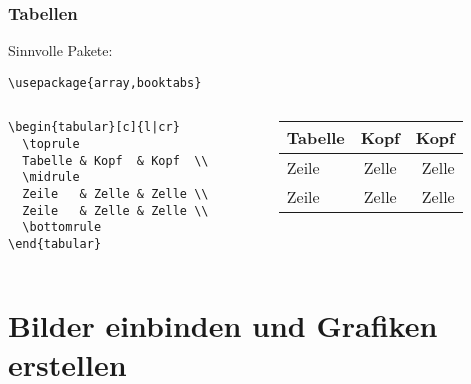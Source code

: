\begin{frame}[fragile]
  \frametitle{Tabellen}

  \onslide<+->

  Sinnvolle Pakete:
\begin{lstlisting}
\usepackage{array,booktabs}
\end{lstlisting}

  \onslide<+->

  \bigskip

  \begin{columns}
    \begin{column}{0.55\linewidth}
\begin{lstlisting}
\begin{tabular}[c]{l|cr}
  \toprule
  Tabelle & Kopf  & Kopf  \\
  \midrule
  Zeile   & Zelle & Zelle \\
  Zeile   & Zelle & Zelle \\
  \bottomrule
\end{tabular}
\end{lstlisting}
    \end{column}
    \begin{column}{0.45\linewidth}
      \centering
      \begin{tabular}[c]{l|cr}
        \toprule
        Tabelle & Kopf & Kopf \\
        \midrule
        Zeile & Zelle & Zelle \\
        Zeile & Zelle & Zelle \\
        \bottomrule
      \end{tabular}
    \end{column}
  \end{columns}

\end{frame}

\section{Bilder einbinden und Grafiken erstellen}

